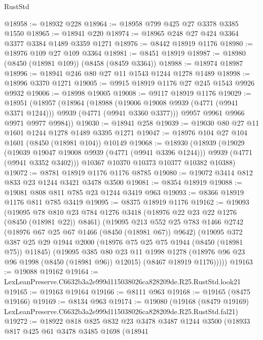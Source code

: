 \begin{lexlean}{RustStd}
\begin{coremodule}
@18958 := @18932 @228
@18964 := @18958 @799 @425 @27 @3378 @3385 @1550
@18965 := @18941 @220
@18974 := @18965 @248 @27 @424 @3364 @3377 @3384 @1489 @3359 @1271
@18976 := @8442 @18919 @1176
@18980 := @18976 @109 @27 @109 @3364
@18981 := @8451 @18919
@18987 := @18980 (@8450 (@18981 @109)) (@8458 (@8459 @3364))
@18988 := @18974 @18987
@18996 := @18941 @246 @80 @27 @11 @1543 @1244 @1278 @1489
@18998 := @18996 @3370 @1271
@19005 := @9915 @18919 @1176 @27 @245 @1543 @9926 @9932
@19006 := @18998 @19005
@19008 := @9117 @18919 @1176
@19029 := @18951
    (@18957
      (@18964
        (@18988 (@19006 @19008 @9939 (@4771 (@9941 @3371 @1244))) @9939 (@4771 (@9941 @3360 @3377)))
        @9957
        @9961
        @9966
        @9971
        @9977
        @9984))
@19030 := @18941 @258
@19039 := @19030 @80 @27 @11 @1601 @1244 @1278 @1489 @3395 @1271
@19047 := @18976 @104 @27 @104 @1601 (@8450 (@18981 @104)) @10149
@19068 := @18930
    (@18939
      (@19029
        (@19039 @19047 @19008 @9939 (@4771 (@9941 @3396 @1244)))
        @9939
        (@4771 (@9941 @3352 @3402)))
      @10367
      @10370
      @10373
      @10377
      @10382
      @10388)
@19072 := @8781 @18919 @1176 @1176 @8785
@19080 := @19072 @3414 @812 @833 @23 @1244 @3421 @3478 @3500
@19081 := @8354 @18919
@19088 := @19081 @808 @811 @785 @23 @1244 @3419 @963
@19093 := @8366 @18919 @1176 @811 @785 @3419
@19095 := @8375 @18919 @1176
@19162 := @19093
    (@19095
      @78
      @810
      @23
      @784
      @1276
      @3418
      (@18976 @22 @23 @22 @1276 (@8450 (@18981 @22)) @8461)
      (@19095
        @213
        @552
        @25
        @783
        @1466
        @2742
        (@18976 @67 @25 @67 @1466 (@8450 (@18981 @67)) @9642)
        (@19095
          @372
          @387
          @25
          @29
          @1944
          @2000
          (@18976 @75 @25 @75 @1944 (@8450 (@18981 @75)) @11845)
          (@19095
            @385
            @80
            @23
            @11
            @1998
            @1278
            (@18976 @96 @23 @96 @1998 (@8450 (@18981 @96)) @12015)
            (@8467 @18919 @1176)))))
@19163 := @19088 @19162
@19164 := LexLeanPreserve.C6632b3a2e999d115038026ca828209de.R25.RustStd.look21
@19165 := @19163 @19164
@19166 := @8111 @963
@19168 := @19165 (@8475 @19166)
@19169 := @8134 @963
@19174 := @19080
    (@19168 (@8479 @19169) LexLeanPreserve.C6632b3a2e999d115038026ca828209de.R25.RustStd.fal21)
@19272 := @18922
    @818
    @825
    @832
    @23
    @3478
    @3487
    @1244
    @3500
    (@18933
      @817
      @425
      @61
      @3478
      @3485
      @1698
      (@18941

\end{coremodule}
\end{lexlean}
